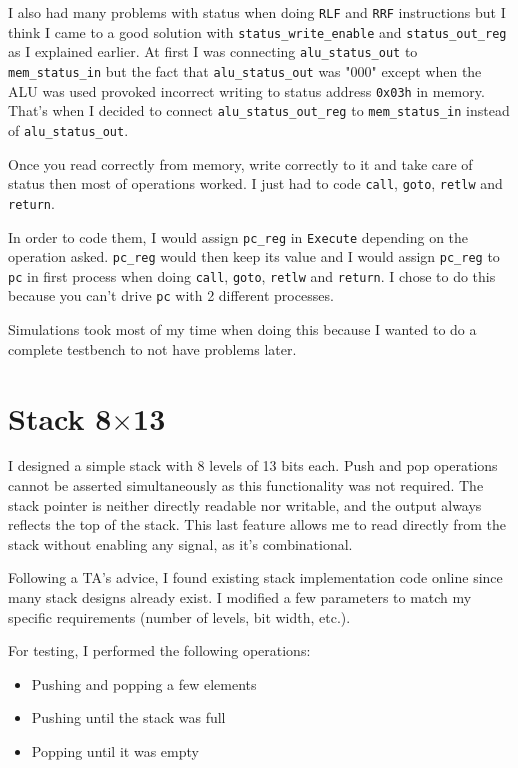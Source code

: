 I also had many problems with status when doing \texttt{RLF} and \texttt{RRF} instructions but I think I came to a good solution with \texttt{status\_write\_enable} and \texttt{status\_out\_reg} as I explained earlier. At first I was connecting \texttt{alu\_status\_out} to \texttt{mem\_status\_in} but the fact that \texttt{alu\_status\_out} was "000" except when the ALU was used provoked incorrect writing to status address \texttt{0x03h} in memory. That's when I decided to connect \texttt{alu\_status\_out\_reg} to \texttt{mem\_status\_in} instead of \texttt{alu\_status\_out}.

Once you read correctly from memory, write correctly to it and take care of status then most of operations worked. I just had to code \texttt{call}, \texttt{goto}, \texttt{retlw} and \texttt{return}.

In order to code them, I would assign \texttt{pc\_reg} in \texttt{Execute} depending on the operation asked. \texttt{pc\_reg} would then keep its value and I would assign \texttt{pc\_reg} to \texttt{pc} in first process when doing \texttt{call}, \texttt{goto}, \texttt{retlw} and \texttt{return}. I chose to do this because you can't drive \texttt{pc} with 2 different processes.

Simulations took most of my time when doing this because I wanted to do a complete testbench to not have problems later.

\section{Stack 8$\times$13}
I designed a simple stack with 8 levels of 13 bits each. Push and pop operations cannot be asserted simultaneously as this functionality was not required. The stack pointer is neither directly readable nor writable, and the output always reflects the top of the stack. This last feature allows me to read directly from the stack without enabling any signal, as it's combinational.

Following a TA's advice, I found existing stack implementation code online since many stack designs already exist. I modified a few parameters to match my specific requirements (number of levels, bit width, etc.).

For testing, I performed the following operations:
\begin{itemize}
    \item Pushing and popping a few elements
    \item Pushing until the stack was full
    \item Popping until it was empty
\end{itemize}

